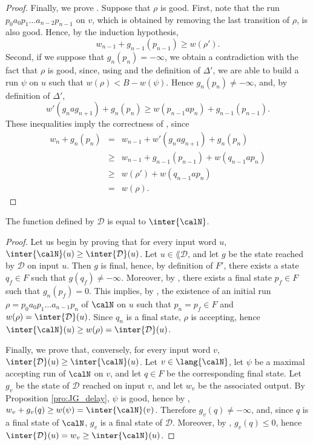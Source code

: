 \documentclass[a4paper]{article}
\begin{document}
\begin{proof}
	Finally, we prove .  Suppose that $\rho$ is good. First, note
	that the run $p_0 a_0 p_1 \ldots a_{n-2}p_{n-1}$ on $v$, which is
	obtained by removing the last transition of $\rho$, is also good.
	Hence, by the induction hypothesis, \[ w_{n-1} + g_{n-1}(p_{n-1}) \geq
	w(\rho').  \] Second, if we suppose that $g_n(p_n) = - \infty$, we
	obtain a contradiction with the fact that $\rho$ is good, since, using
	 and the definition of $\Delta'$, we are able to build a run
	$\psi$ on $u$ such that $w(\rho) < B - w(\psi)$.  Hence $g_n(p_n) \neq -
	\infty$, and, by definition of $\Delta'$, 
	\[
	w'(g_n a g_{n+1}) + g_n(p_n) \geq w(p_{n-1} a p_n) + g_{n-1}(p_{n-1}).
	\]
	These inequalities imply the correctness of , since
	\[
	\begin{array}{lll}
	w_n + g_n(p_n) & = & w_{n-1} +  w'(g_n a g_{n+1}) + g_n(p_n)\\
	& \geq & w_{n-1} + g_{n-1}(p_{n-1}) + w(q_{n-1} a p_n)\\
	& \geq & w(\rho') + w(q_{n-1} a p_n)\\
	& = & w(\rho).
	\end{array}
	\]
\end{proof}

\begin{corollary}
	The function defined by $\mathcal{D}$ is equal to $\inter{\calN}$.
\end{corollary}

\begin{proof}
	Let us begin by proving that for every input word $u$, $\inter{\calN}(u)
	\geq \inter{\mathcal{D}}(u)$.  Let $u \in \lang{\mathcal{D}}$, and let
	$g$ be the state reached by $\mathcal{D}$ on input $u$. Then $g$ is
	final, hence, by definition of $F'$, there exists a state $q_f \in F$
	such that $g(q_f) \neq - \infty$. Moreover, by , there exists a
	final state $p_f \in F$ such that $g_n(p_f) = 0$.  This implies, by
	, the existence of an initial run $\rho = p_0 a_0 p_1 \ldots
	a_{n-1} p_n$ of $\calN$ on $u$ such that $p_n = p_f \in F$ and $w(\rho)
	= \inter{\mathcal{D}}(u)$.  Since $q_n$ is a final state, $\rho$ is
	accepting, hence $\inter{\calN}(u) \geq w(\rho) =
	\inter{\mathcal{D}}(u)$.

	Finally, we prove that, conversely, for every input word $v$,
	$\inter{\mathcal{D}}(u) \geq \inter{\calN}(u)$.  Let $v \in
	\lang{\calN}$, let $\psi$ be a maximal accepting run of $\calN$ on $v$,
	and let $q \in F$ be the corresponding final state.  Let $g_v$ be the
	state of $\mathcal{D}$ reached on input $v$, and let $w_v$ be the
	associated output.  By Proposition \ref{pro:JG_delay}, $\psi$ is good,
	hence by , $w_v + g_v(q) \geq w(\psi) = \inter{\calN}(v)$.
	Therefore $g_v(q) \neq -\infty$, and, since $q$ is a final state of
	$\calN$, $g_v$ is a final state of $\mathcal{D}$.  Moreover, by
	, $g_v(q) \leq 0$, hence $\inter{\mathcal{D}}(u) = w_v \geq
	\inter{\calN}(u)$.
\end{proof}
\end{document}
